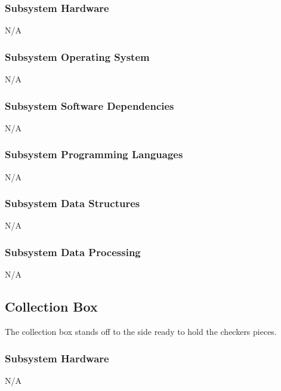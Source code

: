 \subsubsection{Subsystem Hardware}
N/A

\subsubsection{Subsystem Operating System}
N/A

\subsubsection{Subsystem Software Dependencies}
N/A

\subsubsection{Subsystem Programming Languages}
N/A

\subsubsection{Subsystem Data Structures}
N/A

\subsubsection{Subsystem Data Processing}
N/A

\subsection{Collection Box}
The collection box stands off to the side ready to hold the checkers pieces.

\subsubsection{Subsystem Hardware}
N/A

